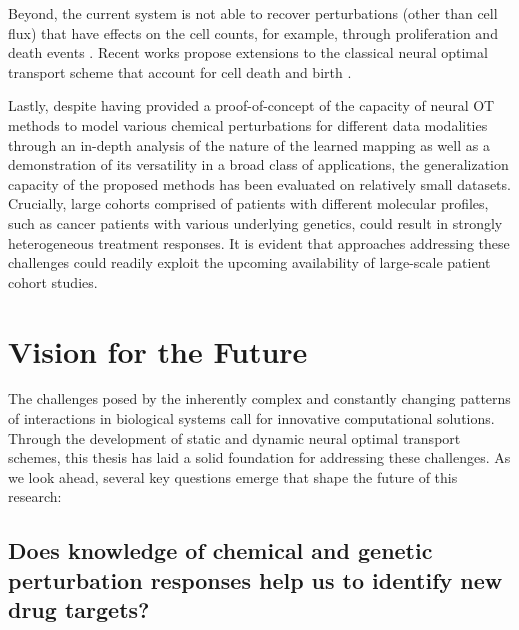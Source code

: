 Beyond, the current system is not able to recover perturbations (other than cell flux) that have effects on the cell counts, for example, through proliferation and death events \citep{tritschler2019concepts}. Recent works propose extensions to the classical neural optimal transport scheme that account for cell death and birth \citep{lubeck2022neural, pariset2023unbalanced, chen2022most, baradat2021regularized}.

Lastly, despite having provided a proof-of-concept of the capacity of neural OT methods to model various chemical perturbations for different data modalities through an in-depth analysis of the nature of the learned mapping as well as a demonstration of its versatility in a broad class of applications, the generalization capacity of the proposed methods has been evaluated on relatively small datasets.
Crucially, large cohorts comprised of patients with different molecular profiles, such as cancer patients with various underlying genetics, could result in strongly heterogeneous treatment responses.
It is evident that approaches addressing these challenges could readily exploit the upcoming availability of large-scale patient cohort studies.

\section*{Vision for the Future}

The challenges posed by the inherently complex and constantly changing patterns of interactions in biological systems call for innovative computational solutions. Through the development of static and dynamic neural optimal transport schemes, this thesis has laid a solid foundation for addressing these challenges.
As we look ahead, several key questions emerge that shape the future of this research:

\subsection*{\textbf{Does knowledge of chemical and genetic perturbation responses help us to identify new drug targets?}}

